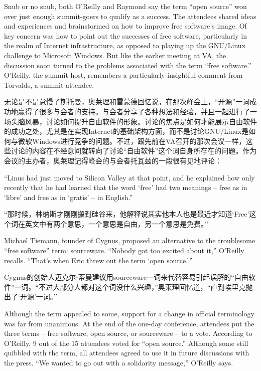 \ifdefined\eng
Snub or no snub, both O'Reilly and Raymond say the term ``open source'' won over just enough summit-goers to qualify as a success. The attendees shared ideas and experiences and brainstormed on how to improve free software's image. Of key concern was how to point out the successes of free software, particularly in the realm of Internet infrastructure, as opposed to playing up the GNU/Linux challenge to Microsoft Windows. But like the earlier meeting at VA, the discussion soon turned to the problems associated with the term ``free software.'' O'Reilly, the summit host, remembers a particularly insightful comment from Torvalds, a summit attendee.
\fi

\ifdefined\chs
无论是不是怠慢了斯托曼，奥莱理和雷蒙德回忆说，在那次峰会上，``开源''一词成功地赢得了很多与会者的支持。与会者分享了各种想法和经验，并且一起进行了一场头脑风暴，讨论如何提升自由软件的形象。讨论的焦点是如何才能展示自由软件的成功之处，尤其是在实现Internet的基础架构方面，而不是讨论GNU/Linux是如何与微软Windows进行竞争的问题。不过，跟先前在VA召开的那次会议一样，这些讨论的内容在不经意间就转向了讨论``自由软件''这个词自身所存在的问题。作为会议的主办者，奥莱理记得峰会的与会者托瓦兹的一段很有见地评论：
\fi

\ifdefined\eng
``Linus had just moved to Silicon Valley at that point, and he explained how only recently that he had learned that the word `free' had two meanings -- free as in `libre' and free as in `gratis' -- in English.''
\fi

\ifdefined\chs
``那时候，林纳斯才刚刚搬到硅谷来，他解释说其实他本人也是最近才知道`Free'这个词在英文中有两个意思，一个意思是自由，另一个意思是免费。''
\fi

\ifdefined\eng
Michael Tiemann, founder of Cygnus, proposed an alternative to the troublesome ``free software'' term: sourceware. ``Nobody got too excited about it,'' O'Reilly recalls. ``That's when Eric threw out the term `open source.'\hspace{0.01in}''
\fi

\ifdefined\chs
Cygnus的创始人迈克尔⋅蒂曼建议用sourceware一词来代替容易引起误解的``自由软件''一词。``不过大部分人都对这个词没什么兴趣，''奥莱理回忆道，``直到埃里克抛出了`开源'一词。''
\fi

\ifdefined\eng
Although the term appealed to some, support for a change in official terminology was far from unanimous. At the end of the one-day conference, attendees put the three terms -- free software, open source, or sourceware -- to a vote. According to O'Reilly, 9 out of the 15 attendees voted for ``open source.'' Although some still quibbled with the term, all attendees agreed to use it in future discussions with the press. ``We wanted to go out with a solidarity message,'' O'Reilly says.
\fi

